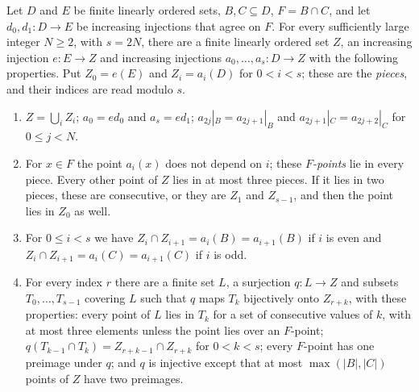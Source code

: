 \begin{lemma}\label{lem:bridgeset}
Let $D$ and $E$ be finite linearly ordered sets, $B,C\subseteq D$,
$F=B\cap C$, and let $d_0,d_1\colon D\to E$ be increasing injections that agree
on $F$. For every sufficiently large integer $N\ge 2$, with $s=2N$, there are a
finite linearly ordered set $Z$, an increasing injection $e\colon E\to Z$ and
increasing injections $a_0,\dots,a_s\colon D\to Z$ with the following
properties. Put $Z_0=e(E)$ and $Z_i=a_i(D)$ for $0<i<s$; these are the
\emph{pieces}, and their indices are read modulo $s$.
\begin{enumerate}
\item[\textup{(i)}] $Z=\bigcup_iZ_i$; $a_0=ed_0$ and $a_s=ed_1$;
 $a_{2j}|_B=a_{2j+1}|_B$ and $a_{2j+1}|_C=a_{2j+2}|_C$ for $0\le j<N$.
\item[\textup{(ii)}] For $x\in F$ the point $a_i(x)$ does not depend on $i$; these
 \emph{$F$-points} lie in every piece. Every other point of $Z$ lies in at
 most three pieces. If it lies in two pieces, these are consecutive, or they
 are $Z_1$ and $Z_{s-1}$, and then the point lies in $Z_0$ as well.
\item[\textup{(iii)}] For $0\le i<s$ we have $Z_i\cap Z_{i+1}=a_i(B)=a_{i+1}(B)$ if
 $i$ is even and $Z_i\cap Z_{i+1}=a_i(C)=a_{i+1}(C)$ if $i$ is odd.
\item[\textup{(iv)}] For every index $r$ there are a finite set $L$, a
 surjection $q\colon L\to Z$ and subsets $T_0,\dots,T_{s-1}$ covering $L$ such
 that $q$ maps $T_k$ bijectively onto $Z_{r+k}$, with these properties: every
 point of $L$ lies in $T_k$ for a set of consecutive values of $k$, with at
 most three elements unless the point lies over an $F$-point;
 $q(T_{k-1}\cap T_k)=Z_{r+k-1}\cap Z_{r+k}$ for $0<k<s$; every $F$-point has
 one preimage under $q$; and $q$ is injective except that at most
 $\max(|B|,|C|)$ points of $Z$ have two preimages.
\end{enumerate}
\end{lemma}

